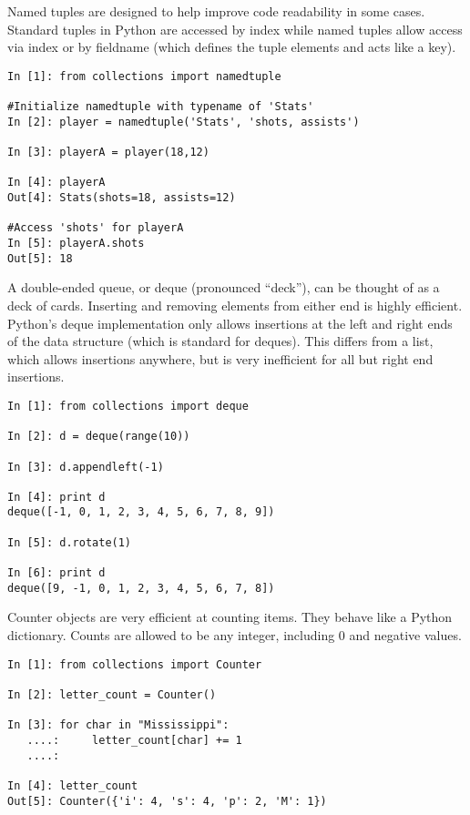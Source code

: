 Named tuples are designed to help improve code readability in some cases.
Standard tuples in Python are accessed by index while named tuples allow access via index or by  fieldname (which defines the tuple elements and acts like a key).
\begin{lstlisting}
In [1]: from collections import namedtuple

#Initialize namedtuple with typename of 'Stats'
In [2]: player = namedtuple('Stats', 'shots, assists')

In [3]: playerA = player(18,12)

In [4]: playerA
Out[4]: Stats(shots=18, assists=12)

#Access 'shots' for playerA
In [5]: playerA.shots
Out[5]: 18
\end{lstlisting}

A double-ended queue, or deque (pronounced ``deck''), can be thought of as a deck of cards.
Inserting and removing elements from either end is highly efficient.
Python's deque implementation only allows insertions at the left and right ends of the data structure (which is standard for deques).
This differs from a list, which allows insertions anywhere, but is very inefficient for all but right end insertions.

\begin{lstlisting}
In [1]: from collections import deque

In [2]: d = deque(range(10))

In [3]: d.appendleft(-1)

In [4]: print d
deque([-1, 0, 1, 2, 3, 4, 5, 6, 7, 8, 9])

In [5]: d.rotate(1)

In [6]: print d
deque([9, -1, 0, 1, 2, 3, 4, 5, 6, 7, 8])
\end{lstlisting}

Counter objects are very efficient at counting items.  They behave like a Python dictionary.  Counts are allowed to be any integer, including 0 and negative values.

\begin{lstlisting}
In [1]: from collections import Counter

In [2]: letter_count = Counter()

In [3]: for char in "Mississippi":
   ....:     letter_count[char] += 1
   ....:     

In [4]: letter_count
Out[5]: Counter({'i': 4, 's': 4, 'p': 2, 'M': 1})
\end{lstlisting}

